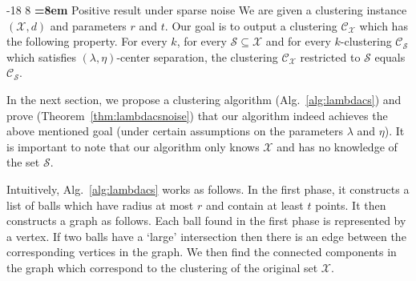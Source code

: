 \documentclass[orivec]{llncs}
\makeatletter
\newcommand{\mc}{\mathcal}
\renewcommand\subsubsection{\@startsection{subsubsection}{3}{\z@}%
   {-18\p@ \@plus -4\p@ \@minus -4\p@}%
   {8\p@ \@plus 4\p@ \@minus 4\p@}%
   {\normalfont\normalsize\bfseries\boldmath
   \rightskip=\z@ \@plus 8em \pretolerance=10000}}
\makeatother
\begin{document}
\subsubsection{Positive result under sparse noise}
\label{section:lambdaPositiveResultSparseNoise}
We are given a clustering instance $(\mc X, d)$ and parameters $r$ and $t$. Our goal is to output a clustering $\mc C_{\mc X}$ which has the following property. For every $k$, for every $\mc S \subseteq \mc X$ and for every $k$-clustering $\mc C_{\mc S}$ which satisfies $(\lambda, \eta)$-center separation, the clustering $\mc C_{\mc X}$ restricted to $\mc S$ equals $\mc C_{\mc S}$. 

In the next section, we propose a clustering algorithm (Alg.~\ref{alg:lambdacs}) and prove (Theorem~\ref{thm:lambdacsnoise}) that our algorithm indeed achieves the above mentioned goal (under certain assumptions on the parameters $\lambda$ and $\eta$). It is important to note that our algorithm only knows $\mc X$ and has no knowledge of the set $\mc S$. 

Intuitively, Alg.~\ref{alg:lambdacs} works as follows. In the first phase, it constructs a list of balls which have radius at most $r$ and contain at least $t$ points. It then constructs a graph as follows. Each ball found in the first phase is represented by a vertex. If two balls have a `large' intersection then there is an edge between the corresponding vertices in the graph. We then find the connected components in the graph which correspond to the clustering of the original set $\mc X$. 
\end{document}
